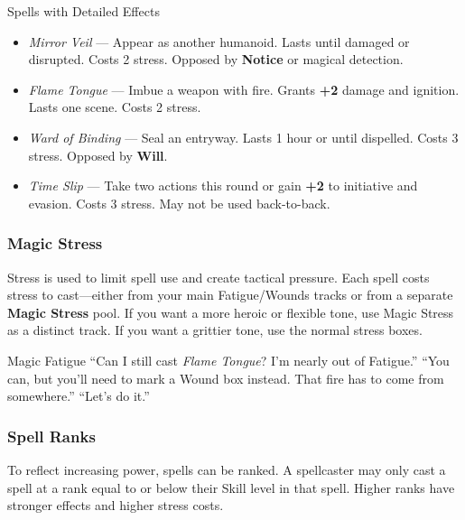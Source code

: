 \begin{Example}{Spells with Detailed Effects}
    \begin{itemize}
        \item \textit{Mirror Veil} — Appear as another humanoid. Lasts until damaged or disrupted. Costs 2 stress. Opposed by \textbf{Notice} or magical detection.
        \item \textit{Flame Tongue} — Imbue a weapon with fire. Grants \textbf{+2} damage and ignition. Lasts one scene. Costs 2 stress.
        \item \textit{Ward of Binding} — Seal an entryway. Lasts 1 hour or until dispelled. Costs 3 stress. Opposed by \textbf{Will}.
        \item \textit{Time Slip} — Take two actions this round or gain \textbf{+2} to initiative and evasion. Costs 3 stress. May not be used back-to-back.
    \end{itemize}
\end{Example}

\subsubsection{Magic Stress}

Stress is used to limit spell use and create tactical pressure. Each spell costs stress to cast—either from your main Fatigue/Wounds tracks or from a separate \textbf{Magic Stress} pool. If you want a more heroic or flexible tone, use Magic Stress as a distinct track. If you want a grittier tone, use the normal stress boxes.

\begin{ExampleGame}{Magic Fatigue}
    \line[Player] “Can I still cast \textit{Flame Tongue}? I’m nearly out of Fatigue.”
    \line[GM]     “You can, but you’ll need to mark a Wound box instead. That fire has to come from somewhere.”
    \line[Player] “Let’s do it.”  
\end{ExampleGame}

\subsubsection{Spell Ranks}

To reflect increasing power, spells can be ranked. A spellcaster may only cast a spell at a rank equal to or below their Skill level in that spell. Higher ranks have stronger effects and higher stress costs.

